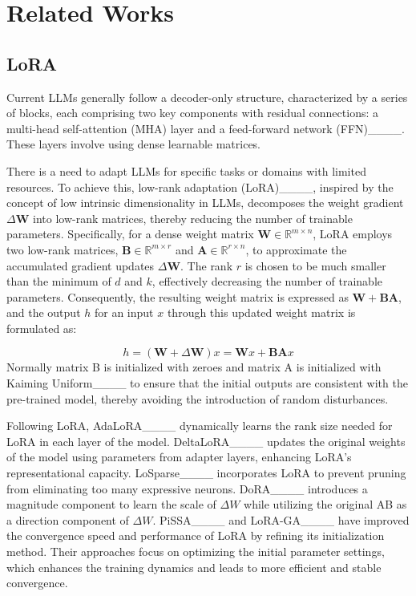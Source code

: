 \section{Related Works}
\subsection{LoRA}
Current LLMs generally follow a decoder-only structure, characterized by a series of blocks, each comprising two key components with residual connections: a multi-head self-attention (MHA) layer and a feed-forward network (FFN)____. These layers involve using dense learnable matrices. 

There is a need to adapt LLMs for specific tasks or domains with limited resources. To achieve this, low-rank adaptation (LoRA)____, inspired by the concept of low intrinsic dimensionality in LLMs, decomposes the weight gradient $\Delta \mathbf{W}$ into low-rank matrices, thereby reducing the number of trainable parameters. Specifically, for a dense weight matrix $\mathbf{W} \in \mathbb{R}^{m \times n}$, LoRA employs two low-rank matrices, $\mathbf{B} \in \mathbb{R}^{m \times r}$ and $\mathbf{A} \in \mathbb{R}^{r \times n}$, to approximate the accumulated gradient updates $\Delta \mathbf{W}$. The rank $r$ is chosen to be much smaller than the minimum of $d$ and $k$, effectively decreasing the number of trainable parameters. Consequently, the resulting weight matrix is expressed as $\mathbf{W} + \mathbf{B}\mathbf{A}$, and the output $h$ for an input $x$ through this updated weight matrix is formulated as:

\begin{equation}
    h = (\mathbf{W} + \Delta \mathbf{W}) x = \mathbf{W} x + \mathbf{B} \mathbf{A} x
    \label{eq:lora_output}
\end{equation}
Normally matrix B is initialized with zeroes and matrix A is initialized with Kaiming Uniform____ to ensure that the initial outputs are consistent with the pre-trained model, thereby avoiding the introduction of random disturbances.

Following LoRA, AdaLoRA____ dynamically learns the rank size needed for LoRA in each layer of the model. DeltaLoRA____ updates the original weights of the model using parameters from adapter layers, enhancing LoRA’s representational capacity. LoSparse____ incorporates LoRA to prevent pruning from eliminating too many expressive neurons. DoRA____ introduces a magnitude component to learn the scale of $\Delta W$ while utilizing the original AB as a direction component of $\Delta W$. PiSSA____ and LoRA-GA____ have improved the convergence speed and performance of LoRA by refining its initialization method. Their approaches focus on optimizing the initial parameter settings, which enhances the training dynamics and leads to more efficient and stable convergence. 


